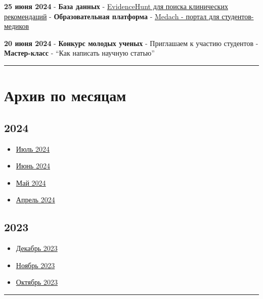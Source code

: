 \documentclass[
  russian,
  12pt,
  a4paper,
]{article}
\providecommand{\tightlist}{%
  \setlength{\itemsep}{0pt}\setlength{\parskip}{0pt}}
\begin{document}
\textbf{25 июня 2024} - \textbf{База данных} -
\href{https://evidencehunt.com}{EvidenceHunt для поиска клинических
рекомендаций} - \textbf{Образовательная платформа} -
\href{https://medach.pro}{Medach - портал для студентов-медиков}

\textbf{20 июня 2024} - \textbf{Конкурс молодых ученых} - Приглашаем к
участию студентов - \textbf{Мастер-класс} - ``Как написать научную
статью''

\begin{center}\rule{0.5\linewidth}{0.5pt}\end{center}

\section{Архив по
месяцам}\label{ux430ux440ux445ux438ux432-ux43fux43e-ux43cux435ux441ux44fux446ux430ux43c}

\subsection{2024}\label{section}

\begin{itemize}
\tightlist
\item
  \hyperref[ux438ux44eux43bux44c-2024]{Июль 2024}
\item
  \hyperref[ux438ux44eux43dux44c-2024]{Июнь 2024}
\item
  \hyperref[ux43cux430ux439-2024]{Май 2024}
\item
  \hyperref[ux430ux43fux440ux435ux43bux44c-2024]{Апрель 2024}
\end{itemize}

\subsection{2023}\label{section-1}

\begin{itemize}
\tightlist
\item
  \hyperref[ux434ux435ux43aux430ux431ux440ux44c-2023]{Декабрь 2023}
\item
  \hyperref[ux43dux43eux44fux431ux440ux44c-2023]{Ноябрь 2023}
\item
  \hyperref[ux43eux43aux442ux44fux431ux440ux44c-2023]{Октябрь 2023}
\end{itemize}

\begin{center}\rule{0.5\linewidth}{0.5pt}\end{center}
\end{document}
